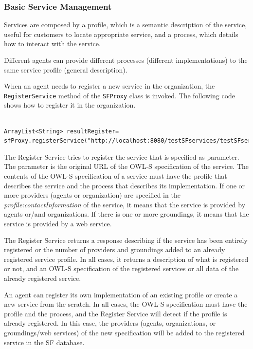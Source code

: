 \subsubsection{Basic Service Management}
Services are composed by a profile, which is a semantic description of the  service, useful for customers to locate appropriate service, and a process, which details how to interact with the service.

Different agents can provide different processes (different implementations) to the same service profile (general description).

When an agent needs to register a new service in the organization, the \lstinline|RegisterService| method of the \lstinline|SFProxy| class is invoked. The following code shows how to register it in the organization.

\begin{lstlisting}

ArrayList<String> resultRegister= sfProxy.registerService("http://localhost:8080/testSFservices/testSFservices/owl/owls/Addition.owl");

\end{lstlisting}

\vspace{1cm}

The Register Service tries to register the service that is specified as parameter. The parameter is the original URL of the OWL-S specification of the service. The contents of the OWL-S specification of a service must have the profile that describes the service and the process that describes its implementation. If one or more providers (agents or organization) are specified in the \textit{profile:contactInformation} of the service, it means that the service is provided by agents or/and organizations. If there is one or more groundings, it means that the service is provided by a web service.


The Register Service returns a response describing if the service has been entirely registered or the number of providers and groundings added to an already registered service profile. In all cases, it returns a description of what is registered or not, and an OWL-S specification of the registered services or all data of the already registered service.



An agent can register its own implementation of an existing profile or create a new service from the scratch. In all cases, the OWL-S specification must have the profile and the process, and the Register Service will detect if the profile is already registered. In this case, the providers (agents, organizations, or groundings/web services) of the new specification will be added to the registered service in the SF database.


